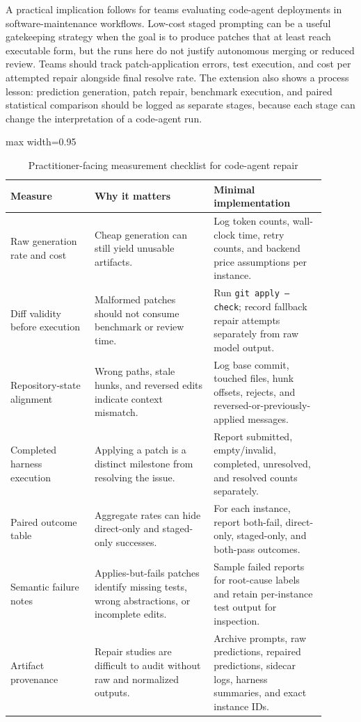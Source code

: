 \documentclass[preprint,12pt]{elsarticle}
\begin{document}
A practical implication follows for teams evaluating code-agent deployments in software-maintenance workflows. Low-cost staged prompting can be a useful gatekeeping strategy when the goal is to produce patches that at least reach executable form, but the runs here do not justify autonomous merging or reduced review. Teams should track patch-application errors, test execution, and cost per attempted repair alongside final resolve rate. The extension also shows a process lesson: prediction generation, patch repair, benchmark execution, and paired statistical comparison should be logged as separate stages, because each stage can change the interpretation of a code-agent run.

\begin{table}[htbp]
\centering
\caption{Practitioner-facing measurement checklist for code-agent repair}
\label{tab:practitioner_checklist}
\footnotesize
\begin{adjustbox}{max width=0.95\linewidth}
\begin{tabular}{@{}>{\raggedright\arraybackslash}p{0.24\linewidth}>{\raggedright\arraybackslash}p{0.34\linewidth}>{\raggedright\arraybackslash}p{0.32\linewidth}@{}}
\toprule
Measure & Why it matters & Minimal implementation \\
\midrule
Raw generation rate and cost & Cheap generation can still yield unusable artifacts. & Log token counts, wall-clock time, retry counts, and backend price assumptions per instance. \\
Diff validity before execution & Malformed patches should not consume benchmark or review time. & Run \texttt{git apply --check}; record fallback repair attempts separately from raw model output. \\
Repository-state alignment & Wrong paths, stale hunks, and reversed edits indicate context mismatch. & Log base commit, touched files, hunk offsets, rejects, and reversed-or-previously-applied messages. \\
Completed harness execution & Applying a patch is a distinct milestone from resolving the issue. & Report submitted, empty/invalid, completed, unresolved, and resolved counts separately. \\
Paired outcome table & Aggregate rates can hide direct-only and staged-only successes. & For each instance, report both-fail, direct-only, staged-only, and both-pass outcomes. \\
Semantic failure notes & Applies-but-fails patches identify missing tests, wrong abstractions, or incomplete edits. & Sample failed reports for root-cause labels and retain per-instance test output for inspection. \\
Artifact provenance & Repair studies are difficult to audit without raw and normalized outputs. & Archive prompts, raw predictions, repaired predictions, sidecar logs, harness summaries, and exact instance IDs. \\
\bottomrule
\end{tabular}
\end{adjustbox}
\end{table}
\end{document}
